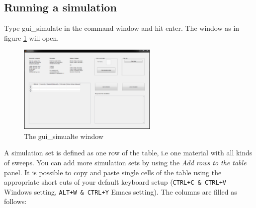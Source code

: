 		\subsection{Running a simulation} \label{sec:RunSim}
			Type gui\_simulate  in the \matlab command window and hit enter. The window as in figure \ref{fig:gui_simulate} will open.
			\begin{figure}[htbp]
				\centering
				\includegraphics[width=0.6\textwidth]{Fig/Scrn_gui_simulate.png}
				\caption{The gui\_simualte window}
				\label{fig:gui_simulate}
			\end{figure}
			A simulation set is defined as one row of the table, i.e one material with all kinds of sweeps. You can add more simulation sets
			by using the {\it Add rows to the table} panel.
			It is possible to copy and paste single cells of the table using the appropriate short cuts of your \matlab default keyboard setup
			(\verb|CTRL+C & CTRL+V| Windows setting, \verb|ALT+W & CTRL+Y| Emacs setting).
			The columns are filled as follows:
